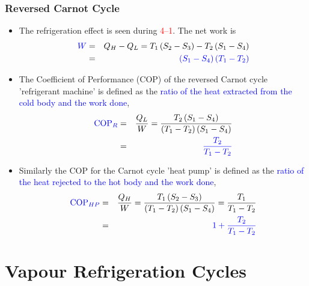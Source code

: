 \documentclass[10pt,compress,handout,ignorenonframetext]{beamer}
\newcommand{\frc}{\displaystyle\frac}
\begin{document}
\begin{frame}
 \frametitle{Reversed Carnot Cycle}

    \begin{itemize}

     \item <1-> The refrigeration effect is seen during \textcolor{red}{4--1}. The net work is
      \begin{eqnarray}
        \textcolor{blue}{W} &=& Q_{H}- Q_{L} = T_{1}\left(S_{2}-S_{3}\right)-T_{2}\left(S_{1}-S_{4}\right)\nonumber \\
        &=& \textcolor{blue}{\left(S_{1}-S_{4}\right)\left(T_{1}-T_{2}\right)} \nonumber
     \end{eqnarray}

     \item <2-> The Coefficient of Performance (COP) of the reversed Carnot cycle 'refrigerant machine' is defined as the \textcolor{blue}{ratio of the heat extracted from the cold body and the work done}, 
        \begin{eqnarray}
         \textcolor{blue}{\text{COP}_{R}} &=& \frc{Q_{L}}{W} = \frc{T_{2}\left(S_{1}-S_{4}\right)}{\left(T_{1}-T_{2}\right)\left(S_{1}-S_{4}\right)} \nonumber \\
                    &=&\textcolor{blue}{ \frc{T_{2}}{T_{1}-T_{2}} }\nonumber 
        \end{eqnarray}

     \item <3-> Similarly the COP for the Carnot cycle 'heat pump' is defined as the \textcolor{blue}{ratio of the heat rejected to the hot body and the work done}, 
        \begin{eqnarray}
         \textcolor{blue}{\text{COP}_{HP}} &=& \frc{Q_{H}}{W} =\frc{T_{1}\left(S_{2}-S_{3}\right)}{\left(T_{1}-T_{2}\right)\left(S_{1}-S_{4}\right)} = \frc{T_{1}}{T_{1}-T_{2}} \nonumber \\
                    &=& \textcolor{blue}{1 + \frc{T_{2}}{T_{1}-T_{2}}} \nonumber 
        \end{eqnarray}

    \end{itemize}
\end{frame}



\section{Vapour Refrigeration Cycles}
\end{document}
